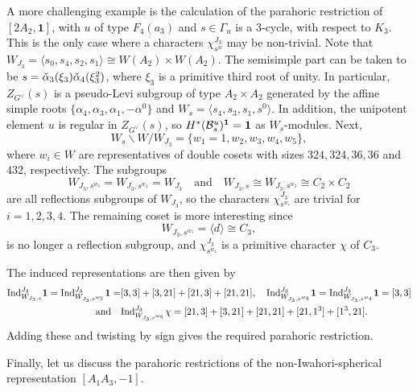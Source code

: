 \begin{example}
    A more challenging example is the calculation of the parahoric restriction of $[2A_2,\mathbf{1}]$, with $u$ of type $F_4(a_3)$ and $s\in\Gamma_u$ is a $3$-cycle, with respect to $K_3$. This is the only case where a characters $\chi_{s^w}^{J_3}$ may be non-trivial. Note that $W_{J_3}=\langle s_0,s_4,s_2,s_1\rangle\cong W(A_2)\times W(A_2)$.
    The semisimple part can be taken to be $s=\check{\alpha}_3(\xi_3)\check{\alpha}_4(\xi_3^2)$, where $\xi_3$ is a primitive third root of unity. In particular, $Z_{G^\vee}(s)$ is a pseudo-Levi subgroup of type $A_2\times A_2$ generated by the affine simple roots $\{\alpha_4,\alpha_3,\alpha_1,-\alpha^0\}$ and $W_s=\langle s_4,s_3,s_1,s^0\rangle$. In addition, the unipotent element $u$ is regular in $Z_{G^\vee}(s)$, so $H^*(\mathcal{B}^u_s)^{\mathbf{1}}=\mathbf{1}$ as $W_s$-modules. Next,
    $$W_s\backslash W/W_{J_3}=\{w_1=1,w_2,w_3,w_4,w_5\},$$
    where $w_i\in W$ are representatives of double cosets with sizes $324, 324, 36, 36$ and $432$, respectively. The subgroups 
    $$W_{J_3,s^{w_3}}=W_{J_3,s^{w_4}}=W_{J_3}\quad\text{and}\quad W_{J_3,s}\cong W_{J_3,s^{w_2}}\cong C_2\times C_2$$
    are all reflections subgroups of $W_{J_3}$, so the characters $\chi_{s^{w_i}}^{J_3}$ are trivial for $i=1,2,3,4$. The remaining coset is more interesting since    
    $$W_{J_3,s^{w_5}}=\langle d \rangle\cong C_3,$$
    is no longer a reflection subgroup, and $\chi_{s^{w_4}}^{J_3}$ is a primitive character $\chi$ of $C_3$. 
    
    The induced representations are then given by
    \begin{align*}
        \mathrm{Ind}_{W_{J_3,s}}^{J_3}\mathbf{1}=\mathrm{Ind}_{W_{J_3,s^{w_2}}}^{J_3}\mathbf{1}=&[3,3]+[3,21]+[21,3]+[21,21],\quad\mathrm{Ind}_{W_{J_3,s^{w_3}}}^{J_3}\mathbf{1}=\mathrm{Ind}_{W_{J_3,s^{w_4}}}^{J_3}\mathbf{1}=[3,3]\\
        \text{and}\quad&\mathrm{Ind}_{W_{J_3,s^{w_5}}}^{J_3}\chi=[21,3]+[3,21]+[21,21]+[21,1^3]+[1^3,21].
    \end{align*}
    Adding these and twisting by sign gives the required parahoric restriction.
\end{example}

Finally, let us discuss the parahoric restrictions of the non-Iwahori-spherical representation $[A_1A_3,-1]$.

